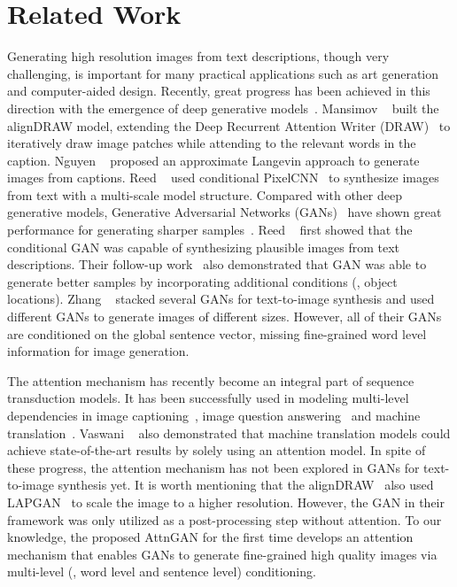 \documentclass[10pt,twocolumn,letterpaper]{article}
\begin{document}
\section{Related Work}
\vspace{-5pt}
Generating high resolution images from text descriptions, though very challenging, is important for many practical applications such as art generation and computer-aided design. Recently, great progress has been achieved in this direction with the emergence of deep generative models~\cite{KingmaW14, Oord16, goodfellow2014generative}. Mansimov \etal~\cite{MansimovPBS15} built the alignDRAW model, extending the Deep Recurrent Attention Writer (DRAW)~\cite{Gregor15DRAW} to iteratively draw image patches while attending to the relevant words in the caption. Nguyen \etal~\cite{NguyenYBDC17} proposed an approximate Langevin approach to generate images from captions.  Reed \etal~\cite{Reed17parallel} used conditional PixelCNN~\cite{Oord16} to synthesize images from text with a multi-scale model structure. Compared with other deep generative models, Generative Adversarial Networks (GANs)~\cite{goodfellow2014generative} have shown great performance for generating sharper samples~\cite{Radford15, DentonCSF15, Salimans2016, Christian2016, pix2pix2017}. Reed \etal~\cite{reed2016generative} first showed that the conditional GAN was capable of synthesizing plausible images from text descriptions. Their follow-up work~\cite{reed2016learning} also demonstrated that GAN was able to generate better samples by incorporating additional conditions (\eg, object locations). Zhang \etal~\cite{Han16stackgan, Han17stackgan2} stacked several GANs for text-to-image synthesis and used different GANs to generate images of different sizes. However, all of their GANs are conditioned on the global sentence vector, missing fine-grained word level information for image generation.  


The attention mechanism has recently become an integral part of sequence transduction models. It has been successfully used in modeling multi-level dependencies in image captioning~\cite{XuBKCCSZB15}, image question answering~\cite{YangHGDS16} and machine translation~\cite{Dzmitry14}. Vaswani \etal~\cite{Ashish17} also demonstrated that machine translation models could achieve state-of-the-art results by solely using an attention model. In spite of these progress, the attention mechanism has not been explored in GANs for text-to-image synthesis yet. It is worth mentioning that the alignDRAW~\cite{MansimovPBS15} also used LAPGAN~\cite{DentonCSF15} to scale the image to a higher resolution. However, the GAN in their framework was only utilized as a post-processing step without attention.  To our knowledge, the proposed AttnGAN for the first time develops an attention mechanism that enables GANs to generate fine-grained high quality images via  multi-level (\eg, word level and sentence level) conditioning. 
\end{document}
